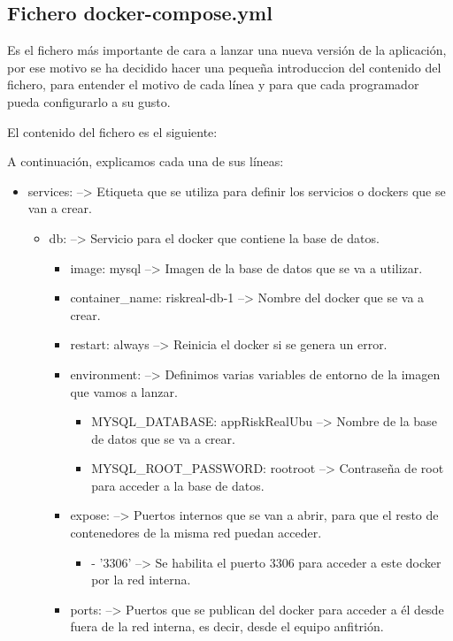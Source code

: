\subsection{Fichero docker-compose.yml}\label{subsec:dockerComposeFile}

Es el fichero más importante de cara a lanzar una nueva versión de la aplicación, por ese motivo se ha decidido hacer una pequeña introduccion del contenido del fichero, para entender el motivo de cada línea y para que cada programador pueda configurarlo a su gusto.

El contenido del fichero es el siguiente:

A continuación, explicamos cada una de sus líneas:
\begin{itemize}
	\item services: --> Etiqueta que se utiliza para definir los servicios o dockers que se van a crear.
	\begin{itemize}
		\item db: --> Servicio para el docker que contiene la base de datos.
		\begin{itemize}
			\item image: mysql --> Imagen de la base de datos que se va a utilizar.
			\item container\_name: riskreal-db-1 --> Nombre del docker que se va a crear.
			\item restart: always --> Reinicia el docker si se genera un error.
			\item environment: --> Definimos varias variables de entorno de la imagen que vamos a lanzar.
			\begin{itemize}
				\item MYSQL\_DATABASE: appRiskRealUbu --> Nombre de la base de datos que se va a crear.
				\item MYSQL\_ROOT\_PASSWORD: rootroot --> Contraseña de root para acceder a la base de datos.
			\end{itemize}
			\item expose: --> Puertos internos que se van a abrir, para que el resto de contenedores de la misma red puedan acceder.
			\begin{itemize}
				\item - '3306' --> Se habilita el puerto 3306 para acceder a este docker por la red interna.
			\end{itemize}
			\item ports: --> Puertos que se publican del docker para acceder a él desde fuera de la red interna, es decir, desde el equipo anfitrión.

\end{itemize}
\end{itemize}
\end{itemize}
